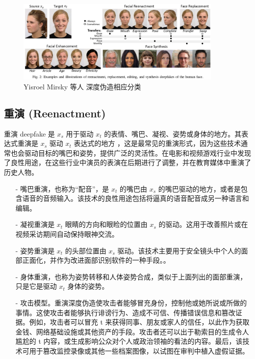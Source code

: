 \begin{figure}[htb]
\centering 
\includegraphics[width=0.90\textwidth]{img/ch4m3.png} 
\caption{ Yisroel Mirsky 等人 \cite{DBLP:journals/corr/abs-2004-11138} 深度伪造相应分类}
\label{Test}
\end{figure}


\subsection{重演 (Reenactment)}

重演 deepfake 是 $x_s$ 用于驱动 $x_t$ 的表情、嘴巴、凝视、姿势或身体的地方。其表达式重演是 $x_s$ 驱动 $x_t$ 表达式的地方
，这是最常见的重演形式，因为这些技术通常也会驱动目标的嘴巴和姿势，提供广泛的灵活性。在电影和视频游戏行业中发现了良性用途，在这些行业中演员的表演在后期进行了调整，并在教育媒体中重演了历史人物。

\begin{itemize}
\item [-] 嘴巴重演，也称为“配音”，是 $x_t$ 的嘴巴由 $x_s$ 的嘴巴驱动的地方，或者是包含语音的音频输入。该技术的良性用途包括将逼真的语音配音成另一种语言和编辑。
\item [-] 凝视重演是 $x_t$ 眼睛的方向和眼睑的位置由 $x_s$ 的驱动。这用于改善照片或在视频采访期间自动保持眼神交流。
\item [-] 姿势重演是 $x_t$ 的头部位置由 $x_s$ 驱动。该技术主要用于安全镜头中个人的面部正面化，并作为改进面部识别软件的一种手段。。
\item [-] 身体重演，也称为姿势转移和人体姿势合成，类似于上面列出的面部重演，只是它是驱动 $x_t$ 身体的姿势。
\item [-] 攻击模型。重演深度伪造使攻击者能够冒充身份，控制他或她所说或所做的事情。这使攻击者能够执行诽谤行为、造成不可信、传播错误信息和篡改证据。例如，攻击者可以冒充 t 来获得同事、朋友或家人的信任，以此作为获取金钱、网络基础设施或其他资产的手段。攻击者还可以出于勒索目的生成令人尴尬的 t 内容，或生成影响公众对个人或政治领袖的看法的内容。最后，该技术可用于篡改监控录像或其他一些档案图像，以试图在审判中植入虚假证据。
\end{itemize}

